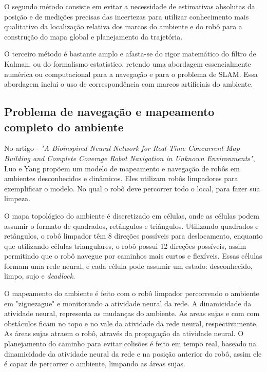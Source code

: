 \documentclass[12pt]{article}
\begin{document}
O segundo método consiste em evitar a necessidade de estimativas absolutas da
posição e de medições precisas das incertezas para utilizar conhecimento mais qualitativo da
localização relativa dos marcos do ambiente e do robô para a construção do mapa global e
planejamento da trajetória\cite{construcaoMapas}.

O terceiro método é bastante amplo e afasta-se do rigor matemático do filtro de
Kalman, ou do formalismo estatístico, retendo uma abordagem essencialmente numérica ou
computacional para a navegação e para o problema de SLAM. Essa abordagem inclui o uso
de correspondência com marcos artificiais do ambiente\cite{construcaoMapas}.

\subsection{Problema de navegação e mapeamento completo do ambiente}
  No artigo \cite{cnn} - \textit{"A Bioinspired Neural Network for Real-Time Concurrent Map Building and Complete Coverage Robot Navigation in Unknown Environments"},
Luo e Yang propõem um modelo de mapeamento e navegação de robôs em ambientes desconhecidos e dinâmicos. Eles utilizam robôs limpadores para exemplificar o modelo. No 
qual o robô deve percorrer todo o local, para fazer sua limpeza.

  O mapa topológico do ambiente é discretizado em células, onde as células podem assumir o formato de quadrados, retângulos e triângulos. 
Utilizando quadrados e retângulos, o robô limpador têm 8 direções possíveis para deslocamento, enquanto que utilizando células triangulares, 
o robô possui 12 direções possíveis, assim permitindo que o robô navegue por caminhos mais curtos e flexíveis. 
Essas células formam uma rede neural, e cada célula pode assumir um estado: desconhecido, limpo, sujo e \textit{deadlock}. 

O mapeamento do ambiente é feito com o robô limpador percorrendo o ambiente em "ziguezague" e monitorando a atividade neural da rede.
A dinamicidade da atividade neural, representa as mudanças do ambiente. As areas sujas e com com obstáculos ficam no topo e no vale da atividade da rede neural, 
respectivamente. As áreas sujas atraem o robô, através da propagação da atividade neural. 
O planejamento do caminho para evitar colisões é feito em tempo real, baseado na dinamicidade da atividade neural da rede e na posição anterior do robô, assim ele 
é capaz de percorrer o ambiente, limpando as áreas sujas.
 
\end{document}
